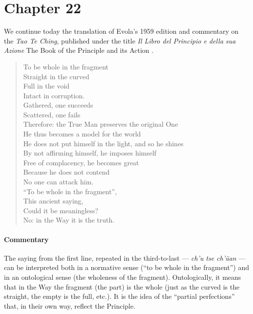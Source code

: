 \section{Chapter 22}

\begin{quotex}
We continue today the translation of Evola's 1959 edition and commentary on the \emph{Tao Te Ching}, published under the title \emph{Il Libro del Principio e della sua Azione} The Book of the Principle and its Action .
\end{quotex}

\begin{verse}
To be whole in the fragment\\ Straight in the curved\\ Full in the void\\ Intact in corruption.\\ Gathered, one succeeds\\ Scattered, one fails\\ Therefore: the True Man preserves the original One\\ He thus becomes a model for the world\\ He does not put himself in the light, and so he shines\\ By not affirming himself, he imposes himself\\ Free of complacency, he becomes great\\ Because he does not contend\\ No one can attack him.\\ ``To be whole in the fragment'',\\ This ancient saying,\\ Could it be meaningless?\\ No: in the Way it is the truth.
\end{verse}

\paragraph{Commentary}


The saying from the first line, repeated in the third-to-last --- \emph{ch'u tse ch'üan} --- can be interpreted both in a normative sense (``to be whole in the fragment'') and in an ontological sense (the wholeness of the fragment). Ontologically, it means that in the Way the fragment (the part) is the whole (just as the curved is the straight, the empty is the full, etc.). It is the idea of the ``partial perfections'' that, in their own way, reflect the Principle.

